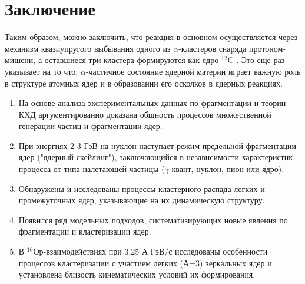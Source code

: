 \documentclass[fontsize=14pt]{scrreport}
\begin{document}
    \chapter*{Заключение}
    Таким образом, можно заключить, что реакция  в основном осуществляется через механизм квазиупругого выбывания одного из $\alpha$-кластеров снаряда протоном-мишени, а оставшиеся три кластера формируются как ядро $^{12}$C . Это еще раз указывает на то что, $\alpha$-частичное состояние ядерной материи играет важную роль в структуре атомных ядер и в образовании его осколков в ядерных реакциях.
    \begin{enumerate}
    \item На основе анализа экспериментальных данных по фрагментации и теории КХД аргументированно доказана общность процессов множественной генерации частиц и фрагментации ядер.
    \item При энергиях 2-3 ГэВ на нуклон наступает режим предельной фрагментации ядер ("ядерный скейлинг"), заключающийся в независимости характеристик процесса от типа налетающей частицы ($\gamma$-квант, нуклон, пион или ядро).
    \item Обнаружены и исследованы процессы кластерного распада легких и промежуточных ядер, указывающие на их динамическую структуру.
    \item Появился ряд модельных подходов, систематизирующих новые явления по фрагментации и кластеризации ядер.
    \item В $^{16}$Ор-взаимодействиях при 3,25 А ГэВ/с исследованы особенности процессов кластеризации с участием легких (А=3) зеркальных ядер и установлена близость кинематических условий их формирования.
\end{enumerate}
\newpage
\end{document}
